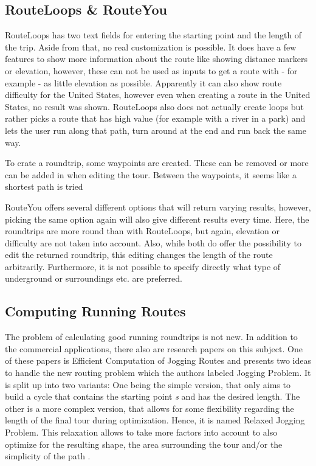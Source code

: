 \subsection{RouteLoops \& RouteYou}
\label{subsec:routeLoopsrouteYou}
RouteLoops has two text fields for entering the starting point and the length of the trip.
Aside from that, no real customization is possible.
It does have a few features to show more information about the route like showing distance markers or elevation, however, these can not be used as inputs to get a route with - for example - as little elevation as possible.
Apparently it can also show route difficulty for the United States, however even when creating a route in the United States, no result was shown. 
RouteLoops also does not actually create loops but rather picks a route that has high value (for example with a river in a park) and lets the user run along that path, turn around at the end and run back the same way.

To crate a roundtrip, some \glqq waypoints\grqq{} are created. 
These can be removed or more can be added in when editing the tour.
Between the waypoints, it seems like a shortest path is tried 

RouteYou offers several different options that will return varying results, however, picking the same option again will also give different results every time.   
Here, the roundtrips are more round than with RouteLoops, but again, elevation or difficulty are not taken into account. 
Also, while both do offer the possibility to edit the returned roundtrip, this editing changes the length of the route arbitrarily.
Furthermore, it is not possible to specify directly what type of underground or surroundings etc. are preferred. 

\subsection{Computing Running Routes}
\label{subsec:runningRoutes}

The problem of calculating good running roundtrips is not new.
In addition to the commercial applications, there also are research papers on this subject.
One of these papers is \glqq Efficient Computation of Jogging Routes\grqq \cite{gemsa_efficient_2013} and presents two ideas to handle the new routing problem which the authors labeled \glqq Jogging Problem\grqq .
It is split up into two variants: 
One being the simple version, that only aims to build a cycle that contains the starting point \textit{s} and has the desired length.
The other is a more complex version, that allows for some flexibility regarding the length of the final tour during optimization. 
Hence, it is named \glqq Relaxed Jogging Problem\grqq . 
This relaxation allows to take more factors into account to also optimize for the resulting shape, the area surrounding the tour and/or the simplicity of the path \cite{gemsa_efficient_2013}. 

